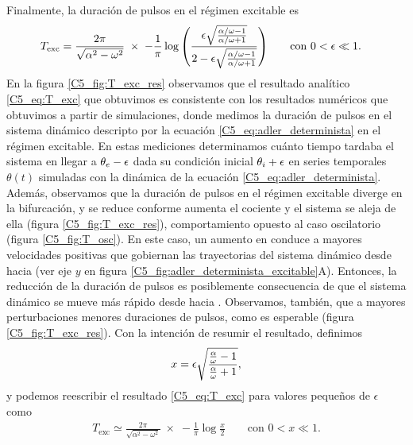 \documentclass[./main.tex]{subfiles}
\begin{document}
Finalmente, la duración de pulsos en el régimen excitable es
\begin{align}
T_{\text{exc}} &=\frac{2\pi}{\sqrt{\alpha^2 - \omega^2}} \; \times \; -\frac{1}{\pi}  \log{\left( \frac{\epsilon \sqrt{\frac{\dddelta - 1}{\dddelta + 1}}}{2-\epsilon \sqrt{\frac{\dddelta - 1}{\dddelta + 1}}}\right)} \qquad \text{con } 0<\epsilon \ll 1.
    \label{C5_eq:T_exc}
\end{align}
En la figura \ref{C5_fig:T_exc_res} observamos que el resultado analítico \ref{C5_eq:T_exc} que obtuvimos es consistente con los resultados numéricos que obtuvimos a partir de simulaciones, donde medimos la duración de pulsos en el sistema dinámico descripto por la ecuación \ref{C5_eq:adler_determinista} en el régimen excitable. En estas mediciones determinamos cuánto tiempo tardaba el sistema en llegar a $\theta_e-\epsilon$ dada su condición inicial $\theta_i+\epsilon$ en series temporales $\theta(t)$ simuladas con la dinámica de la ecuación \ref{C5_eq:adler_determinista}. Además, observamos que la duración de pulsos en el régimen excitable diverge en la bifurcación, y se reduce conforme aumenta el cociente \dddelta y el sistema se aleja de ella (figura \ref{C5_fig:T_exc_res}), comportamiento opuesto al caso oscilatorio (figura \ref{C5_fig:T_osc}). En este caso, un aumento en \dddelta conduce a mayores velocidades positivas que gobiernan las trayectorias del sistema dinámico desde \xxi hacia \xxe (ver eje $y$ en figura \ref{C5_fig:adler_determinista_excitable}A). Entonces, la reducción de la duración de pulsos es posiblemente consecuencia de que el sistema dinámico se mueve más rápido desde \xxi hacia \xxe. Observamos, también, que a mayores perturbaciones menores duraciones de pulsos, como es esperable (figura \ref{C5_fig:T_exc_res}). Con la intención de resumir el resultado, definimos 
\begin{equation}
    x = \epsilon \sqrt{\frac{\frac{\alpha}{\omega} - 1}{\frac{\alpha}{\omega} + 1}},
\end{equation}
y podemos reescribir el resultado \ref{C5_eq:T_exc} para valores pequeños de $\epsilon$ como
\begin{align}
    T_{\text{exc}} \simeq \frac{2\pi}{\sqrt{\alpha^2 - \omega^2}} \; \times \; -\frac{1}{\pi}  \log{\frac{x}{2}} \qquad \text{con } 0<x \ll 1.
    \label{C5_eq:T_exc_aprox}
\end{align}
\end{document}
